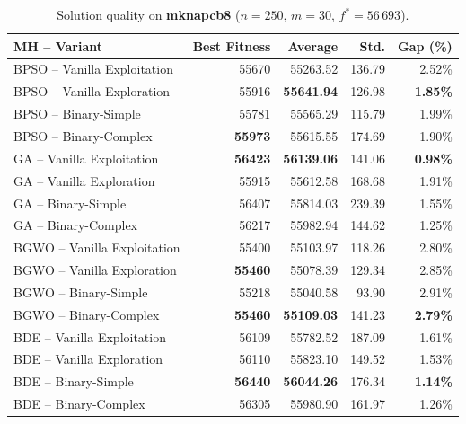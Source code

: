 \documentclass[journal,article,submit,moreauthors]{Definitions/mdpi}
\begin{document}
\begin{table}[htbp]
  \centering
  \small
  \caption{Solution quality on \textbf{mknapcb8}
  ($n=250$, $m=30$, $f^*=56\,693$).}
  \label{tab:calidad_mknapcb8}
  \begin{tabular}{lrrrr}
    \toprule
    \textbf{MH -- Variant} &
    \textbf{Best Fitness} &
    \textbf{Average} &
    \textbf{Std.} &
    \textbf{Gap (\%)} \\
    \midrule
    BPSO -- Vanilla Exploitation & 55670 & 55263.52 & 136.79 & 2.52\% \\
    BPSO -- Vanilla Exploration  & 55916 & \textbf{55641.94} & 126.98 & \textbf{1.85\%} \\
    BPSO -- Binary-Simple        & 55781 & 55565.29 & 115.79 & 1.99\% \\
    BPSO -- Binary-Complex       & \textbf{55973} & 55615.55 & 174.69 & 1.90\% \\
    \midrule
    GA -- Vanilla Exploitation   & \textbf{56423} & \textbf{56139.06} & 141.06 & \textbf{0.98\%} \\
    GA -- Vanilla Exploration    & 55915 & 55612.58 & 168.68 & 1.91\% \\
    GA -- Binary-Simple          & 56407 & 55814.03 & 239.39 & 1.55\% \\
    GA -- Binary-Complex         & 56217 & 55982.94 & 144.62 & 1.25\% \\
    \midrule
    BGWO -- Vanilla Exploitation & 55400 & 55103.97 & 118.26 & 2.80\% \\
    BGWO -- Vanilla Exploration  & \textbf{55460} & 55078.39 & 129.34 & 2.85\% \\
    BGWO -- Binary-Simple        & 55218 & 55040.58 & 93.90 & 2.91\% \\
    BGWO -- Binary-Complex       & \textbf{55460} & \textbf{55109.03} & 141.23 & \textbf{2.79\%} \\
    \midrule
    BDE -- Vanilla Exploitation  & 56109 & 55782.52 & 187.09 & 1.61\% \\
    BDE -- Vanilla Exploration   & 56110 & 55823.10 & 149.52 & 1.53\% \\
    BDE -- Binary-Simple         & \textbf{56440} & \textbf{56044.26} & 176.34 & \textbf{1.14\%} \\
    BDE -- Binary-Complex        & 56305 & 55980.90 & 161.97 & 1.26\% \\
    \bottomrule
  \end{tabular}
\end{table}
\end{document}
